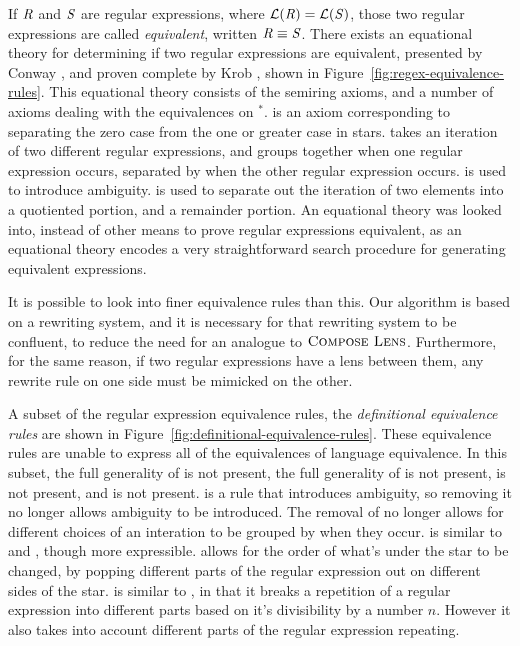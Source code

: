 \documentclass[numbers]{sigplanconf}
\begin{document}
If $\mathit{R}$ and $\mathit{S}$ are regular expressions, where
$\mathcal{L}(\mathit{R})=\mathcal{L}(\mathit{S})$, those two regular expressions
are called \textit{equivalent}, written $\mathit{R}\equiv\mathit{S}$.
There exists an equational theory for determining if two regular expressions
are equivalent, presented by Conway \cite{conway}, and proven complete by Krob
\cite{Krob}, shown in Figure~\ref{fig:regex-equivalence-rules}.  This equational
theory consists of the semiring axioms, and a number of axioms dealing with the
equivalences on $^*$.  \ProductstarRule{} is an axiom corresponding to separating the
zero case from the one or greater case in stars.  \SumstarRule{} takes an iteration of two
different regular expressions, and groups together when one regular expression occurs,
separated by when the other regular expression occurs.  \StarstarRule{} is used
to 
introduce ambiguity.  \DicyclicityRule{} is used to separate out the iteration
of two elements into a quotiented portion, and a remainder portion.  An
equational theory was looked into, instead of other means to prove regular
expressions equivalent, as an equational theory encodes a very straightforward
search procedure for generating equivalent expressions.

It is possible to look into finer equivalence rules than this.
Our algorithm is based on a rewriting system, and it is necessary for that
rewriting system to be confluent, to reduce the need for an analogue to
$\textsc{Compose Lens}$.  Furthermore, for the same reason, if two regular
expressions have a lens between them, any rewrite rule on one side must be
mimicked on the other.

A subset of
the regular expression equivalence rules, the \textit{definitional equivalence
  rules} are shown in
Figure~\ref{fig:definitional-equivalence-rules}.  These equivalence rules are
unable to express all of the equivalences of language equivalence.  In this
subset, the full generality of \SumstarRule{} is not present, the full
generality of \DicyclicityRule{} is not present, \StarstarRule{} is not present,
and \SumstarRule{} is not present.  \StarstarRule{} is a rule that introduces
ambiguity, so removing it no longer allows ambiguity to be introduced.
  The
removal of \SumstarRule{} no longer allows for different choices of an
interation to be grouped by when they occur.  \ProductstarRule{} is similar to
\UnrollstarLeftRule{} and \UnrollstarRightRule{}, though more expressible.
\ProductstarRule{}
allows for the order of what's under the star to be changed, by popping
different parts of the regular expression out on different sides of the star.
\DicyclicityRule{} is
similar to \QuotientstarRule{}, in that it breaks a repetition of a regular
expression into different parts based on it's divisibility by a number $n$.  However
it also takes into account different parts of the regular expression repeating.
\end{document}
